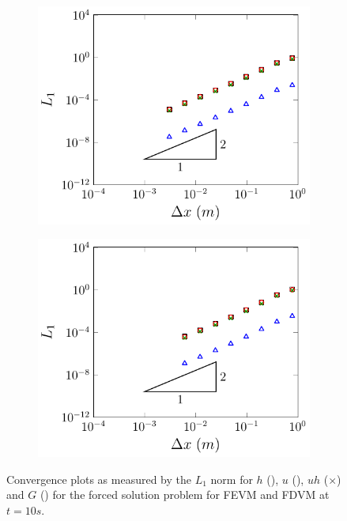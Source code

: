 \begin{figure}
	\centering
	\begin{subfigure}{0.5\textwidth}
		\includegraphics[width=\textwidth]{./chp5/figures/Forced/Wet/FEVML1.pdf}
		\vspace{0.5cm}
	\end{subfigure}%
	\begin{subfigure}{0.5\textwidth}
		\includegraphics[width=\textwidth]{./chp5/figures/Forced/Wet/FDVML1.pdf}
		\vspace{0.5cm}
	\end{subfigure}
	\caption{Convergence plots as measured by the $L_1$ norm for $h$ (), $u$ (),  $uh$ ({\color{green!60!black}$\times$})  and $G$ () for the forced solution problem for FEVM and FDVM at $t=10s$.}
\end{figure}


